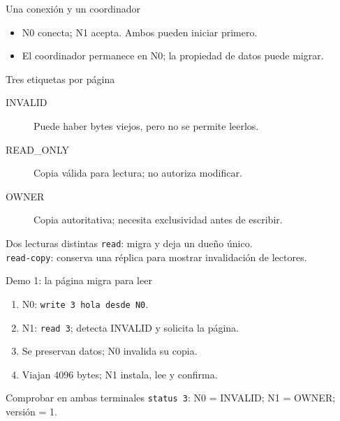\documentclass[aspectratio=169]{beamer}
\begin{document}
\begin{frame}{Una conexión y un coordinador}
\centering
{}
\vspace{.4cm}
\begin{itemize}
\item N0 conecta; N1 acepta. Ambos pueden iniciar primero.
\item El coordinador permanece en N0; la propiedad de datos puede migrar.
\end{itemize}
\end{frame}

\begin{frame}{Tres etiquetas por página}
\begin{description}
\item[INVALID] Puede haber bytes viejos, pero no se permite leerlos.
\item[READ\_ONLY] Copia válida para lectura; no autoriza modificar.
\item[OWNER] Copia autoritativa; necesita exclusividad antes de escribir.
\end{description}
\begin{block}{Dos lecturas distintas}
\texttt{read}: migra y deja un dueño único.\\
\texttt{read-copy}: conserva una réplica para mostrar invalidación de lectores.
\end{block}
\end{frame}

\begin{frame}{Demo 1: la página migra para leer}
\begin{enumerate}
\item N0: \texttt{write 3 hola desde N0}.
\item N1: \texttt{read 3}; detecta INVALID y solicita la página.
\item Se preservan datos; N0 invalida su copia.
\item Viajan 4096 bytes; N1 instala, lee y confirma.
\end{enumerate}
\begin{block}{Comprobar en ambas terminales}
\texttt{status 3}: N0 = INVALID; N1 = OWNER; versión = 1.
\end{block}
\end{frame}
\end{document}
